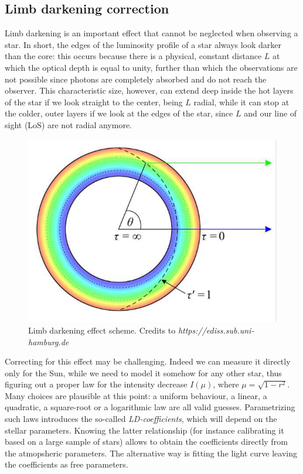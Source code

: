 \documentclass[a4paper,11pt,twocolumn]{article}
\begin{document}
\subsection{Limb darkening correction}

Limb darkening is an important effect that cannot be neglected when observing a star.
In short, the edges of the luminosity profile 
of a star always look darker than the core: this occurs because there is a physical, constant 
distance $L$ at which the optical depth is equal to unity, further than which 
the observations are not possible since photons are completely absorbed and do not reach the observer. This characteristic size, 
however, can extend deep inside the hot layers of the star if we look straight 
to the center, being $L$ radial, while it can stop at the colder, outer layers 
if we look at the edges of the star, since $L$ and our line of sight (LoS) are not radial 
anymore.
\begin{figure}[H]
    \centering  
    \includegraphics[scale=0.25, angle=0]{../pictures/limb_darkening.png}
    \caption{Limb darkening effect scheme. Credits to \textit{https://ediss.sub.uni-hamburg.de}}
\end{figure}
Correcting for this effect may be challenging. Indeed we can measure it 
directly only for the Sun, while we need to model it somehow for any other 
star, thus figuring out a proper law for the intensity decrease $I(\mu)$, 
where $\mu = \sqrt{1-r^2}$. Many choices are plausible at this point: a 
uniform behaviour, a linear, a quadratic, a square-root or a 
logarithmic law are all valid guesses. Parametrizing such laws introduces 
the so-called \textit{LD-coefficients}, which will depend on the stellar 
parameters. Knowing the latter relationship (for instance calibrating it 
based on a large sample of stars) allows to obtain the coefficients directly 
from the atmopsheric parameters. 
The alternative way is fitting the light curve leaving the coefficients as free parameters.
\end{document}
